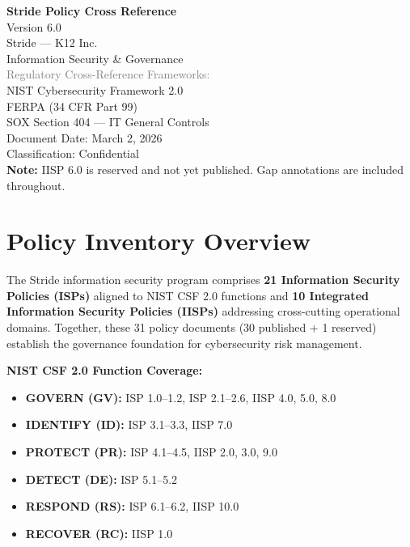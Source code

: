 \documentclass[11pt,landscape]{article}
\begin{document}
\begin{titlepage}
\vspace*{2cm}
\begin{center}
{\Huge\bfseries\textcolor{stridegreen}{Stride Policy Cross Reference}}\\[0.5cm]
{\LARGE Version 6.0}\\[1cm]
{\large Stride — K12 Inc.}\\[0.3cm]
{\large Information Security \& Governance}\\[2cm]
{\normalsize\textcolor{gray}{Regulatory Cross-Reference Frameworks:}}\\[0.3cm]
{\normalsize NIST Cybersecurity Framework 2.0}\\
{\normalsize FERPA (34 CFR Part 99)}\\
{\normalsize SOX Section 404 — IT General Controls}\\[2cm]
{\small Document Date: March 2, 2026}\\
{\small Classification: Confidential}\\[1cm]
\textcolor{gapred}{\textbf{Note:} IISP 6.0 is reserved and not yet published. Gap annotations are included throughout.}
\end{center}
\end{titlepage}

\tableofcontents
\newpage

\section{Policy Inventory Overview}

The Stride information security program comprises \textbf{21 Information Security Policies (ISPs)} aligned to NIST CSF 2.0 functions and \textbf{10 Integrated Information Security Policies (IISPs)} addressing cross-cutting operational domains. Together, these 31 policy documents (30 published + 1 reserved) establish the governance foundation for cybersecurity risk management.

\vspace{0.3cm}
\textbf{NIST CSF 2.0 Function Coverage:}
\begin{itemize}
    \item \textbf{GOVERN (GV):} ISP 1.0--1.2, ISP 2.1--2.6, IISP 4.0, 5.0, 8.0
    \item \textbf{IDENTIFY (ID):} ISP 3.1--3.3, IISP 7.0
    \item \textbf{PROTECT (PR):} ISP 4.1--4.5, IISP 2.0, 3.0, 9.0
    \item \textbf{DETECT (DE):} ISP 5.1--5.2
    \item \textbf{RESPOND (RS):} ISP 6.1--6.2, IISP 10.0
    \item \textbf{RECOVER (RC):} IISP 1.0
\end{itemize}
\end{document}
